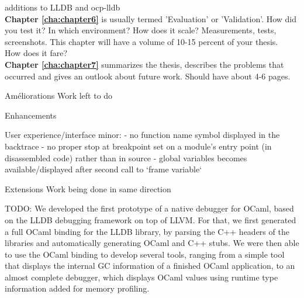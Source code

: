 additions to LLDB and ocp-lldb
\\
\textbf{Chapter \ref{cha:chapter6}} is usually termed 'Evaluation' or 'Validation'. How did you test it? In which environment? How does it scale? Measurements, tests, screenshots. This chapter will have a volume of 10-15 percent of your thesis.
\\
How does it fare?
\\
\textbf{Chapter \ref{cha:chapter7}} summarizes the thesis, describes the problems that occurred and gives an outlook about future work. Should have about 4-6 pages.

Améliorations
Work left to do

Enhancements

User experience/interface minor:
- no function name symbol displayed in the backtrace
- no proper stop at breakpoint set on a module's entry point (in disassembled code) rather than in source
- global variables becomes available/displayed after second call to `frame variable`


Extensions
Work being done in same direction

TODO:
We developed the first prototype of a native debugger for OCaml, based on the LLDB debugging framework on top of LLVM. For that, we first generated a full OCaml binding for the LLDB library, by parsing the C++ headers of the libraries and automatically generating OCaml and C++ stubs. We were then able to use the OCaml binding to develop several tools, ranging from a simple tool that displays the internal GC information of a finished OCaml application, to an almost complete debugger, which displays OCaml values using runtime type information added for memory profiling.
